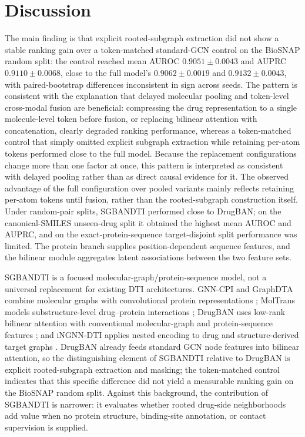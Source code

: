 \documentclass[computers,article,submit,moreauthors]{Definitions/mdpi}
\begin{document}
\section{Discussion}
The main finding is that explicit rooted-subgraph extraction did not show a stable ranking gain over a token-matched standard-GCN control on the BioSNAP random split: the control reached mean AUROC $0.9051 \pm 0.0043$ and AUPRC $0.9110 \pm 0.0068$, close to the full model's $0.9062 \pm 0.0019$ and $0.9132 \pm 0.0043$, with paired-bootstrap differences inconsistent in sign across seeds. The pattern is consistent with the explanation that delayed molecular pooling and token-level cross-modal fusion are beneficial: compressing the drug representation to a single molecule-level token before fusion, or replacing bilinear attention with concatenation, clearly degraded ranking performance, whereas a token-matched control that simply omitted explicit subgraph extraction while retaining per-atom tokens performed close to the full model. Because the replacement configurations change more than one factor at once, this pattern is interpreted as consistent with delayed pooling rather than as direct causal evidence for it. The observed advantage of the full configuration over pooled variants mainly reflects retaining per-atom tokens until fusion, rather than the rooted-subgraph construction itself. Under random-pair splits, SGBANDTI performed close to DrugBAN; on the canonical-SMILES unseen-drug split it obtained the highest mean AUROC and AUPRC, and on the exact-protein-sequence target-disjoint split performance was limited. The protein branch supplies position-dependent sequence features, and the bilinear module aggregates latent associations between the two feature sets.

SGBANDTI is a focused molecular-graph/protein-sequence model, not a universal replacement for existing DTI architectures. GNN-CPI and GraphDTA combine molecular graphs with convolutional protein representations \citep{tsubaki2019,nguyen2021graphdta}; MolTrans models substructure-level drug--protein interactions \citep{huang2021moltrans}; DrugBAN uses low-rank bilinear attention with conventional molecular-graph and protein-sequence features \citep{bai2023drugban}; and iNGNN-DTI applies nested encoding to drug and structure-derived target graphs \citep{sun2024ingnndti}. DrugBAN already feeds standard GCN node features into bilinear attention, so the distinguishing element of SGBANDTI relative to DrugBAN is explicit rooted-subgraph extraction and masking; the token-matched control indicates that this specific difference did not yield a measurable ranking gain on the BioSNAP random split. Against this background, the contribution of SGBANDTI is narrower: it evaluates whether rooted drug-side neighborhoods add value when no protein structure, binding-site annotation, or contact supervision is supplied.
\end{document}
